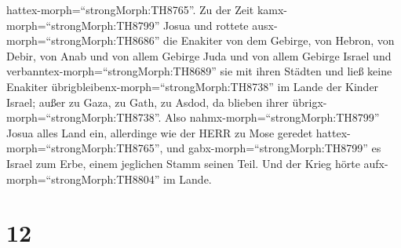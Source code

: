 hattex-morph=``strongMorph:TH8765''.  Zu der Zeit
kamx-morph=``strongMorph:TH8799'' Josua und rottete
ausx-morph=``strongMorph:TH8686'' die Enakiter von dem Gebirge, von
Hebron, von Debir, von Anab und von allem Gebirge Juda und von allem
Gebirge Israel und verbanntex-morph=``strongMorph:TH8689'' sie mit ihren
Städten  und ließ keine Enakiter
übrigbleibenx-morph=``strongMorph:TH8738'' im Lande der Kinder Israel;
außer zu Gaza, zu Gath, zu Asdod, da blieben ihrer
übrigx-morph=``strongMorph:TH8738''.  Also
nahmx-morph=``strongMorph:TH8799'' Josua alles Land ein, allerdinge wie
der HERR zu Mose geredet hattex-morph=``strongMorph:TH8765'', und
gabx-morph=``strongMorph:TH8799'' es Israel zum Erbe, einem jeglichen
Stamm seinen Teil. Und der Krieg hörte aufx-morph=``strongMorph:TH8804''
im Lande.

\hypertarget{section-11}{%
\section{12}\label{section-11}}

